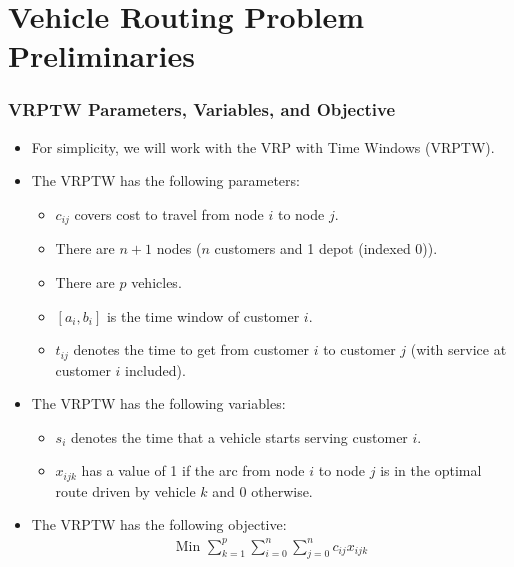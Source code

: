 \documentclass{beamer}
\begin{document}
	\section{Vehicle Routing Problem Preliminaries}

	\begin{frame}[t]
		\frametitle{VRPTW Parameters, Variables, and Objective}
		\small
		\begin{itemize}
			\vspace{-.25cm}
			\item For simplicity, we will work with the VRP with Time Windows (VRPTW).
			\item The VRPTW has the following parameters:
			\begin{itemize}
				\item $c_{ij}$ covers cost to travel from node $i$ to node $j$.
				\item There are $n + 1$ nodes ($n$ customers and 1 depot (indexed 0)).
				\item There are $p$ vehicles.
				\item $[a_i, b_i]$ is the time window of customer $i$.
				\item $t_{ij}$ denotes the time to get from customer $i$ to customer $j$ (with service at customer $i$ included).
			\end{itemize}
			\item The VRPTW has the following variables:
			\begin{itemize}
				\item $s_i$ denotes the time that a vehicle starts serving customer $i$.
				\item $x_{ijk}$ has a value of 1 if the arc from node $i$ to node $j$ is in the optimal route driven by vehicle $k$ and 0 otherwise.
			\end{itemize}
			\item The VRPTW has the following objective:
			\begin{align*}
				\text{Min } \sum_{k = 1}^{p}{\sum_{i = 0}^{n}{\sum_{j = 0}^{n}{c_{ij}x_{ijk}}}}
			\end{align*}
		\end{itemize}
		\normalsize
	\end{frame}
\end{document}
